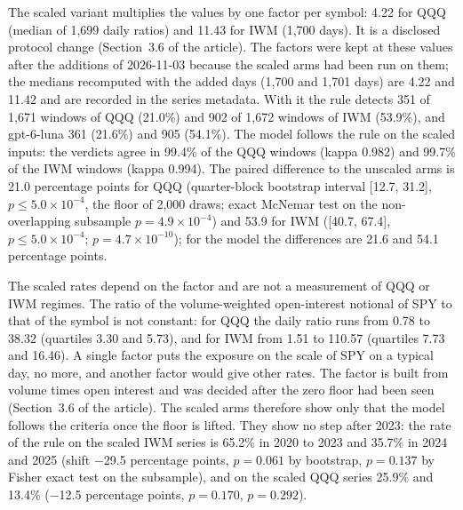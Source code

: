The scaled variant multiplies the  values by one factor per symbol: 4.22 for QQQ (median of 1{,}699 daily ratios) and 11.43 for IWM (1{,}700 days). It is a disclosed protocol change (Section~3.6 of the article). The factors were kept at these values after the additions of 2026-11-03 because the scaled arms had been run on them; the medians recomputed with the added days (1{,}700 and 1{,}701 days) are 4.22 and 11.42 and are recorded in the series metadata. With it the rule detects 351 of 1{,}671 windows of QQQ (21.0\%) and 902 of 1{,}672 windows of IWM (53.9\%), and gpt-6-luna 361 (21.6\%) and 905 (54.1\%). The model follows the rule on the scaled inputs: the verdicts agree in 99.4\% of the QQQ windows (kappa 0.982) and 99.7\% of the IWM windows (kappa 0.994). The paired difference to the unscaled arms is 21.0 percentage points for QQQ (quarter-block bootstrap interval [12.7, 31.2], $p\le5.0\times10^{-4}$, the floor of 2{,}000 draws; exact McNemar test on the non-overlapping subsample $p=4.9\times10^{-4}$) and 53.9 for IWM ([40.7, 67.4], $p\le5.0\times10^{-4}$; $p=4.7\times10^{-10}$); for the model the differences are 21.6 and 54.1 percentage points.

The scaled rates depend on the factor and are not a measurement of QQQ or IWM regimes. The ratio of the volume-weighted open-interest notional of SPY to that of the symbol is not constant: for QQQ the daily ratio runs from 0.78 to 38.32 (quartiles 3.30 and 5.73), and for IWM from 1.51 to 110.57 (quartiles 7.73 and 16.46). A single factor puts the exposure on the scale of SPY on a typical day, no more, and another factor would give other rates. The factor is built from volume times open interest and was decided after the zero floor had been seen (Section~3.6 of the article). The scaled arms therefore show only that the model follows the criteria once the floor is lifted. They show no step after 2023: the rate of the rule on the scaled IWM series is 65.2\% in 2020 to 2023 and 35.7\% in 2024 and 2025 (shift $-$29.5 percentage points, $p=0.061$ by bootstrap, $p=0.137$ by Fisher exact test on the subsample), and on the scaled QQQ series 25.9\% and 13.4\% ($-$12.5 percentage points, $p=0.170$, $p=0.292$).

